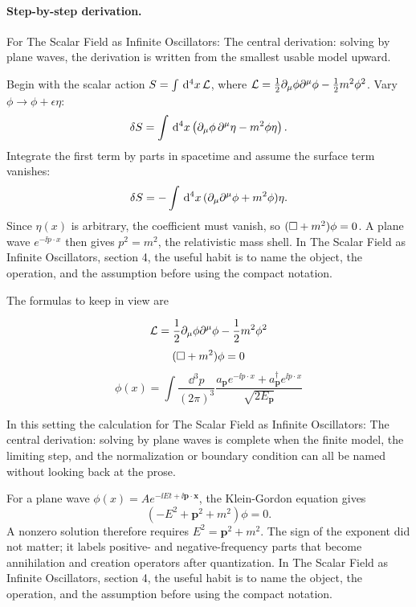 \paragraph{Step-by-step derivation.}

For The Scalar Field as Infinite Oscillators: The central derivation: solving by plane waves, the derivation is written from the smallest usable model upward.

Begin with the scalar action \(S=\int\,\mathrm d^4x\,\mathcal L\), where \(\mathcal L=\frac12\partial_\mu\phi\partial^\mu\phi-\frac12m^2\phi^2\).  Vary \(\phi\to\phi+\epsilon\eta\):
\[
  \delta S=\int\,\mathrm d^4x\left(\partial_\mu\phi\,\partial^\mu\eta-m^2\phi\eta\right).
\]
Integrate the first term by parts in spacetime and assume the surface term vanishes:
\[
  \delta S=-\int\,\mathrm d^4x\,(\partial_\mu\partial^\mu\phi+m^2\phi)\eta.
\]
Since \(\eta(x)\) is arbitrary, the coefficient must vanish, so \((\Box+m^2)\phi=0\).  A plane wave \(e^{-\ii p\cdot x}\) then gives \(p^2=m^2\), the relativistic mass shell.  In The Scalar Field as Infinite Oscillators, section 4, the useful habit is to name the object, the operation, and the assumption before using the compact notation.

The formulas to keep in view are

\[
  \mathcal L=\frac12\partial_\mu\phi\partial^\mu\phi-\frac12m^2\phi^2
\]
\[
  (\Box+m^2)\phi=0
\]
\[
  \phi(x)=\int\frac{\dd^3p}{(2\pi)^3}\frac{a_{\bm p}e^{-\ii p\cdot x}+a_{\bm p}^\dagger e^{\ii p\cdot x}}{\sqrt{2E_{\bm p}}}
\]

In this setting the calculation for The Scalar Field as Infinite Oscillators: The central derivation: solving by plane waves is complete when the finite model, the limiting step, and the normalization or boundary condition can all be named without looking back at the prose.




\begin{example}
For a plane wave \(\phi(x)=Ae^{-\ii Et+\ii\bm p\cdot\bm x}\), the Klein-Gordon equation gives
\[
  (-E^2+\bm p^2+m^2)\phi=0.
\]
A nonzero solution therefore requires \(E^2=\bm p^2+m^2\).  The sign of the exponent did not matter; it labels positive- and negative-frequency parts that become annihilation and creation operators after quantization.  In The Scalar Field as Infinite Oscillators, section 4, the useful habit is to name the object, the operation, and the assumption before using the compact notation.
\end{example}



